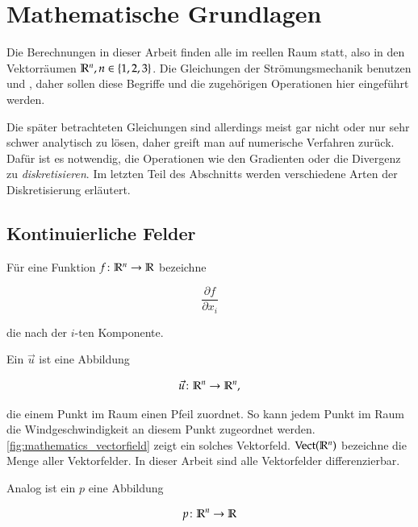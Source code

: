 \section{Mathematische Grundlagen}

Die Berechnungen in dieser Arbeit finden alle im reellen Raum statt, also in den
Vektorräumen $\mathbb{R}^n, n \in \{1,2,3\}$. Die Gleichungen der
Strömungsmechanik benutzen  und
, daher sollen diese Begriffe und die zugehörigen
Operationen hier eingeführt werden.

Die später betrachteten Gleichungen sind allerdings meist gar nicht oder nur sehr
schwer analytisch zu lösen, daher greift man auf numerische Verfahren zurück.
Dafür ist es notwendig, die Operationen wie den Gradienten oder die
Divergenz zu \emph{diskretisieren}. Im letzten Teil des Abschnitts
werden verschiedene Arten der Diskretisierung erläutert.

\subsection{Kontinuierliche Felder}

Für eine Funktion $f \colon \mathbb{R}^n \to \mathbb{R}$ bezeichne

\begin{equation}
\frac{\partial f}{\partial x_i}
\end{equation}

die  nach der $i$-ten Komponente.

Ein  $\vec{u}$ ist eine Abbildung

\begin{equation*}
\vec{u} \colon \mathbb{R}^n \to \mathbb{R}^n,
\end{equation*}

die einem Punkt im Raum einen Pfeil zuordnet. So kann \PimiddyzB jedem
Punkt im Raum die Windgeschwindigkeit an diesem Punkt zugeordnet
werden. \autoref{fig:mathematics_vectorfield} zeigt ein solches
Vektorfeld. $\operatorname*{Vect}(\mathbb{R}^n)$ bezeichne die
Menge aller Vektorfelder. In dieser Arbeit sind alle Vektorfelder
differenzierbar.

Analog ist ein  $p$ eine Abbildung

\begin{equation*}
p \colon \mathbb{R}^n \to \mathbb{R}
\end{equation*}

